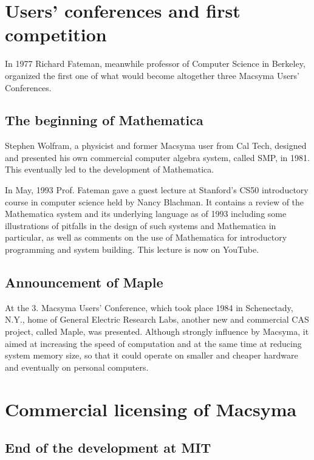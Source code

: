 \documentclass[../Maxima_Workbook.tex]{subfiles}
\begin{document}
\section{Users' conferences and first competition}

\lz In 1977 Richard Fateman, meanwhile professor of Computer Science in Berkeley, organized the first one of what would become altogether three Macsyma Users' Conferences.

\subsection{The beginning of Mathematica}

Stephen Wolfram, a physicist and former Macsyma user from Cal Tech, designed and presented his own commercial computer algebra system, called SMP, in 1981. This eventually led to the development of Mathematica.

\lz In May, 1993 Prof. Fateman gave a guest lecture at Stanford's CS50 introductory course in computer science held by Nancy Blachman. It contains a review of the Mathematica system and its underlying language as of 1993 including some illustrations of pitfalls in the design of such systems and Mathematica in particular, as well as comments on the use of Mathematica for introductory programming and system building. This lecture is now on YouTube.

\subsection{Announcement of Maple}

At the 3. Macsyma Users' Conference, which took place 1984 in Schenectady, N.Y., home of General Electric Research Labs, another new and commercial CAS project, called Maple, was presented. Although strongly influence by Macsyma, it aimed at increasing the speed of computation and at the same time at reducing system memory size, so that it could operate on smaller and cheaper hardware and eventually on personal computers.

\section{Commercial licensing of Macsyma}

\subsection{End of the development at MIT}
\end{document}

